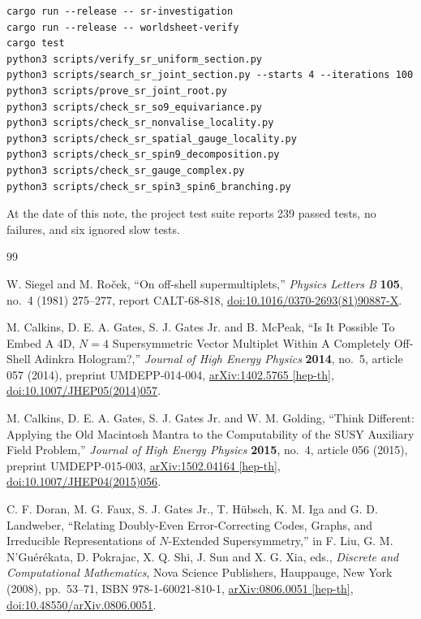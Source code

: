 \documentclass[11pt]{article}
\begin{document}
\begin{verbatim}
cargo run --release -- sr-investigation
cargo run --release -- worldsheet-verify
cargo test
python3 scripts/verify_sr_uniform_section.py
python3 scripts/search_sr_joint_section.py --starts 4 --iterations 100
python3 scripts/prove_sr_joint_root.py
python3 scripts/check_sr_so9_equivariance.py
python3 scripts/check_sr_nonvalise_locality.py
python3 scripts/check_sr_spatial_gauge_locality.py
python3 scripts/check_sr_spin9_decomposition.py
python3 scripts/check_sr_gauge_complex.py
python3 scripts/check_sr_spin3_spin6_branching.py
\end{verbatim}

At the date of this note, the project test suite reports 239 passed tests, no failures,
and six ignored slow tests.

\begin{thebibliography}{99}
\small
\setlength{\itemsep}{0.45\baselineskip}

W. Siegel and M. Ro\v cek,
``On off-shell supermultiplets,''
\emph{Physics Letters B} \textbf{105}, no.~4 (1981) 275--277,
report CALT-68-818,
\href{https://doi.org/10.1016/0370-2693(81)90887-X}{doi:10.1016/0370-2693(81)90887-X}.

M. Calkins, D. E. A. Gates, S. J. Gates Jr. and B. McPeak,
``Is It Possible To Embed A 4D, $N=4$ Supersymmetric Vector Multiplet Within A
Completely Off-Shell Adinkra Hologram?,''
\emph{Journal of High Energy Physics} \textbf{2014}, no.~5, article 057
(2014), preprint UMDEPP-014-004,
\href{https://arxiv.org/abs/1402.5765}{arXiv:1402.5765 [hep-th]},
\href{https://doi.org/10.1007/JHEP05(2014)057}{doi:10.1007/JHEP05(2014)057}.

M. Calkins, D. E. A. Gates, S. J. Gates Jr. and W. M. Golding,
``Think Different: Applying the Old Macintosh Mantra to the Computability of
the SUSY Auxiliary Field Problem,''
\emph{Journal of High Energy Physics} \textbf{2015}, no.~4, article 056
(2015), preprint UMDEPP-015-003,
\href{https://arxiv.org/abs/1502.04164}{arXiv:1502.04164 [hep-th]},
\href{https://doi.org/10.1007/JHEP04(2015)056}{doi:10.1007/JHEP04(2015)056}.

C. F. Doran, M. G. Faux, S. J. Gates Jr., T. H\"ubsch, K. M. Iga and
G. D. Landweber,
``Relating Doubly-Even Error-Correcting Codes, Graphs, and Irreducible
Representations of $N$-Extended Supersymmetry,''
in F. Liu, G. M. N'Gu\'er\'ekata, D. Pokrajac, X. Q. Shi, J. Sun and X. G. Xia,
eds., \emph{Discrete and Computational Mathematics}, Nova Science Publishers,
Hauppauge, New York (2008), pp.~53--71, ISBN 978-1-60021-810-1,
\href{https://arxiv.org/abs/0806.0051}{arXiv:0806.0051 [hep-th]},
\href{https://doi.org/10.48550/arXiv.0806.0051}{doi:10.48550/arXiv.0806.0051}.


\end{thebibliography}
\end{document}
